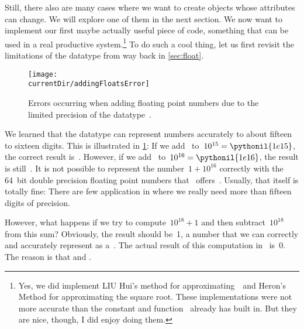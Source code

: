 Still, there also are many cases where we want to create objects whose attributes can change.
We will explore one of them in the next section.%
\FloatBarrier%
\endhsection%
%
%
\FloatBarrier%
%
We now want to implement our first maybe actually useful piece of code, something that can be used in a real productive system.\footnote{%
Yes, we did implement LIU Hui's method for approximating~\numberPi\ and Heron's Method for approximating the square root. %
These implementations were not more accurate than the constant and function \python\ already has built in. %
But they are nice, though, I did enjoy doing them.}
To do such a cool thing, let us first revisit the limitations of the datatype  from way back in \cref{sec:float}. %
%
\begin{figure}%
\centering%
\texttt{[image: \\currentDir/addingFloatsError]}%
\caption{Errors occurring when adding floating point numbers due to the limited precision of the datatype~.}%
\label{fig:addingFloatsError}%
\end{figure}%
%
We learned that the datatype  can represent numbers accurately to about fifteen to sixteen digits.
This is illustrated in \cref{fig:addingFloatsError}:
If we add~ to~$10^{15}=\pythonil{1e15}$, the correct result is~.
However, if we add~ to~$10^{16}=\pythonil{1e16}$, the result is still~.
It is not possible to represent the number~$1+10^{16}$ correctly with the 64~bit double precision floating point numbers that \python\ offers~\cite{PSF2024FPAIAL}.
Usually, that itself is totally fine:
There are few application in  where we really need more than fifteen digits of precision.

However, what happens if we try to compute~$10^{18}+1$ and then subtract~$10^{18}$ from this sum?
Obviously, the result should be~1, a number that we can correctly and accurately represent as a~.
The actual result of this computation in \python\ is~0.
The reason is that  and .

